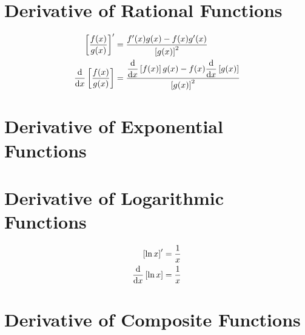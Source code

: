 \documentclass[20150903-160354-rs2.2-MarksMathNotebook.tex]{subfiles}
\begin{document}
\section{Derivative of Rational Functions}


\begin{arule}
\begin{align}
	\left[ \dfrac{f(x)}{g(x)} \right]' &= \dfrac{f'(x)g(x)-f(x)g'(x)}{\left[g(x)\right]^2} \label{eq:drf1} \\
	\dfrac{\mathrm{d}}{\mathrm{d}x} \left[ \dfrac{f(x)}{g(x)} \right] & = \dfrac{\dfrac{\mathrm{d}}{\mathrm{d}x}\left[f(x)\right]g(x)-f(x) \dfrac{\mathrm{d}}{\mathrm{d}x} \left[g(x)\right] }{\left[g(x)\right]^2}  \label{eq:drf2}
\end{align}
\end{arule}



\section{Derivative of Exponential Functions}

\section{Derivative of Logarithmic Functions}

\begin{arule}
\begin{align}
	\left[\ln x \right]' &= \frac{1}{x} \label{eq:dnl1} \\
	\dfrac{\mathrm{d}}{\mathrm{d}x} \left[\ln x \right] &= \frac{1}{x}  \label{eq:dnl2}
\end{align}
\end{arule}




\section{Derivative of Composite Functions}
\end{document}
